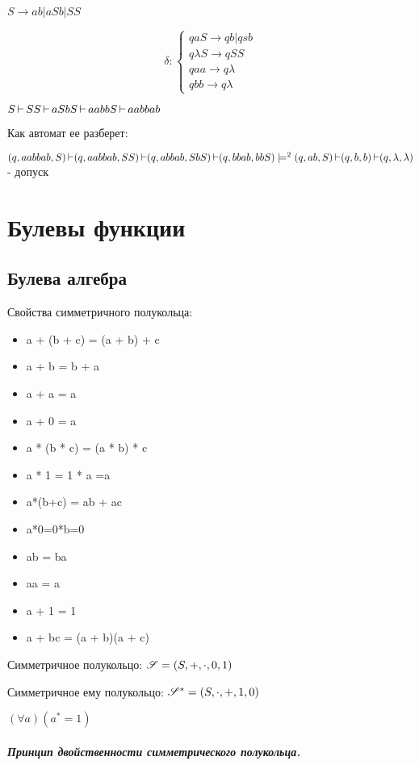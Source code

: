 $S \to ab \big| aSb \big| SS$

\[
\delta: \begin{cases}
    qaS \to qb\big| qsb\\
    q\lambda S \to qSS\\
    qaa \to q\lambda\\
    qbb \to q\lambda
\end{cases}
\] 

$S \operatorname{\vdash} SS \operatorname{\vdash} aSbS \operatorname{\vdash} aabbS \operatorname{\vdash} aabbab$

Как автомат ее разберет:

$
(q,aabbab,S) \operatorname{\vdash} (q, aabbab, SS) \operatorname{\vdash} (q, abbab, SbS) \operatorname{\vdash} (q, bbab, bbS) \models^{2}
(q,ab,S) \operatorname{\vdash} (q, b, b) \operatorname{\vdash} (q,\lambda,\lambda)
$ - допуск

\chapter{Булевы функции}

\section{Булева алгебра}

Свойства симметричного полукольца:
\begin{itemize}
    \item a + (b + c) = (a + b) + c
    \item a + b = b + a
    \item a + a = a
    \item a + 0 = a
    \item a * (b * c) = (a * b) * c
    \item a * 1 = 1 * a =a
    \item a*(b+c) = ab + ac
    \item a*0=0*b=0
    \item ab = ba
    \item aa = a
    \item a + 1 = 1
    \item a + bc = (a + b)(a + c)
\end{itemize}

Симметричное полукольцо:
$\mathscr{S} = (S, +, \cdot , 0 , 1)$ 

Симметричное ему полукольцо:
$\mathscr{S}^{*} = (S, \cdot , +, 1, 0)$

$(\forall a)(a^{*} = 1)$

\paragraph*{Принцип двойственности симметрического полукольца.}

